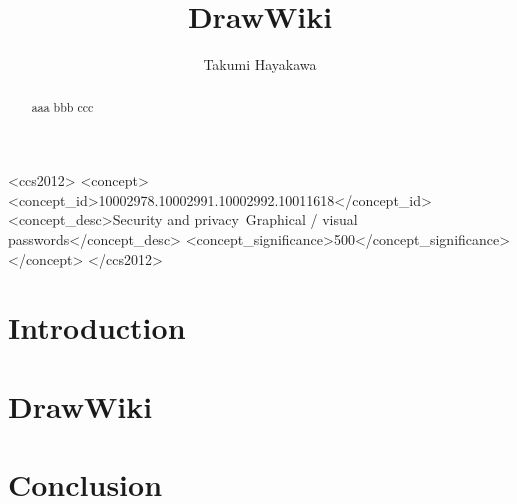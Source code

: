 \documentclass[sigconf]{acmart}
\begin{document}
\title{DrawWiki}


\author{Takumi Hayakawa}

\renewcommand{\shortauthors}{T. Hayakawa}

\begin{CCSXML}
  <ccs2012>
  <concept>
  <concept_id>10002978.10002991.10002992.10011618</concept_id>
  <concept_desc>Security and privacy~Graphical / visual passwords</concept_desc>
  <concept_significance>500</concept_significance>
  </concept>
  </ccs2012>
\end{CCSXML}


\begin{abstract}

aaa bbb ccc

\end{abstract}

\maketitle

\section{Introduction}

\section{DrawWiki}

\section{Conclusion}

\large


\end{document}
